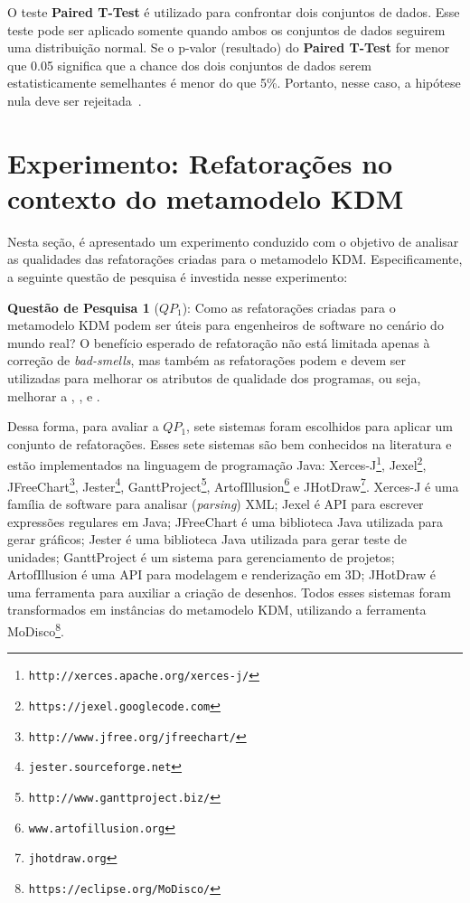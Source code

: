 O teste \textbf{Paired T-Test} é utilizado para confrontar dois conjuntos de dados. Esse teste pode ser aplicado somente quando ambos os conjuntos de dados seguirem uma distribuição normal. Se o p-valor (resultado) do \textbf{Paired T-Test} for menor que 0.05 significa que a chance dos dois conjuntos de dados serem estatisticamente semelhantes é menor do que 5\%. Portanto, nesse caso, a hipótese nula deve ser rejeitada~\cite{Wohlin}.

\section{Experimento: Refatorações no contexto do metamodelo KDM}\label{sec:experimento}

Nesta seção, é apresentado um experimento conduzido com o objetivo de analisar as qualidades das refatorações criadas para o metamodelo KDM. Especificamente, a seguinte questão de pesquisa é investida nesse experimento:

\textbf{Questão de Pesquisa 1} (\textbf{$QP_1$}): Como as refatorações criadas para o metamodelo KDM podem ser úteis para engenheiros de software no cenário do mundo real? O benefício esperado de refatoração não está limitada apenas à correção de \textit{bad-smells}, mas também as refatorações podem e devem ser utilizadas para melhorar os atributos de qualidade dos programas, ou seja, melhorar a , ,  e .


Dessa forma, para avaliar a \textbf{$QP_1$}, sete sistemas foram escolhidos para aplicar um conjunto de refatorações. Esses sete sistemas são bem conhecidos na literatura e estão implementados na linguagem de programação Java: Xerces-J\footnote{\texttt{http://xerces.apache.org/xerces-j/}}, Jexel\footnote{\texttt{https://jexel.googlecode.com}}, JFreeChart\footnote{\texttt{http://www.jfree.org/jfreechart/}}, Jester\footnote{\texttt{jester.sourceforge.net}}, GanttProject\footnote{\texttt{http://www.ganttproject.biz/}}, ArtofIllusion\footnote{\texttt{www.artofillusion.org}} e JHotDraw\footnote{\texttt{jhotdraw.org}}. Xerces-J é uma família de software para analisar (\textit{parsing}) XML; Jexel é API para escrever expressões regulares em Java; JFreeChart é uma biblioteca Java utilizada para gerar gráficos; Jester é uma biblioteca Java utilizada para gerar teste de unidades; GanttProject é um sistema para gerenciamento de projetos; ArtofIllusion é uma API para modelagem e renderização em 3D; JHotDraw é uma ferramenta para auxiliar a criação de desenhos. Todos esses sistemas foram transformados em instâncias do metamodelo KDM, utilizando a ferramenta MoDisco\footnote{\texttt{https://eclipse.org/MoDisco/}}. 


